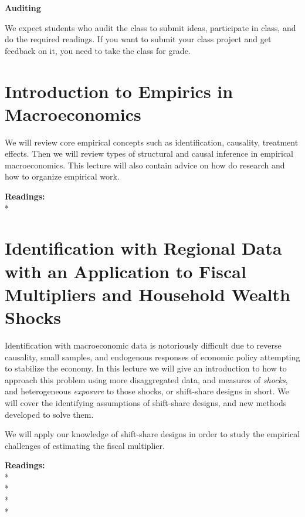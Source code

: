 \documentclass [12pt]{article}
\begin{document}
\noindent  \textbf{Auditing}

\noindent We expect students who audit the class to submit ideas, participate in class, and do the required readings. If you want to submit your class project and get feedback on it, you need to take the class for grade.





\section{Introduction to Empirics in Macroeconomics}

We will review core empirical concepts such as identification, causality, treatment effects. Then we will review types of structural and causal inference in empirical macroeconomics. This lecture will also contain advice on how do research and how to organize empirical work. 

\noindent\textbf{Readings:}\\
*

\section{Identification with Regional Data with an Application to Fiscal Multipliers and Household Wealth Shocks}

Identification with macroeconomic data is notoriously difficult due to reverse causality, small samples, and endogenous responses of economic policy attempting to stabilize the economy. In this lecture we will give an introduction to how to approach this problem using more disaggregated data, and measures of  \textit{shocks}, and heterogeneous \textit{exposure} to those shocks, or shift-share designs in short. We will cover the identifying assumptions of shift-share designs, and new methods developed to solve them. 

We will apply our knowledge of shift-share designs in order to study the empirical challenges of estimating the fiscal multiplier.

\noindent\textbf{Readings:}\\
*\\
*\\
*\\  
*\\
 \\
\\
\\
\\
\\
\end{document}
